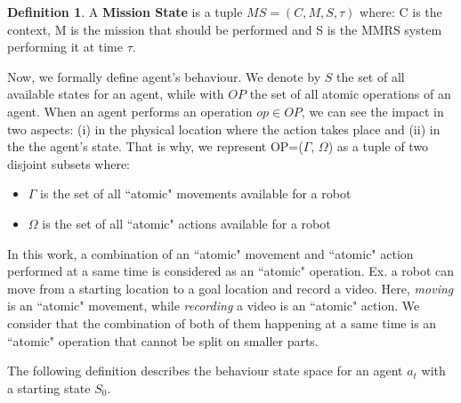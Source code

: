 \documentclass[journal]{IEEEtran}
\theoremstyle{definition}
\newtheorem{definition}{Definition}
\newcommand\patrizio[1]{\nb{Patrizio}{#1}}
\begin{document}
\begin{definition}
A \textbf{Mission State} is a tuple $MS = ( C, M, S, \tau  )$ where: C is the context, M is the mission that should be performed and S is the MMRS system performing it at time $\tau$.
\end{definition}









Now, we formally define agent's behaviour. We denote by  $S$ the set of all available states for an agent, while with $OP$ the set of all atomic operations of an agent. When an agent performs an operation $op \in OP$, we can see the  impact in two aspects: (i) in the physical location where the action takes place and (ii) in the the agent's state.
That is why, we represent  OP=($\Gamma$, $\Omega$) as a tuple of two disjoint subsets where:
\begin{itemize}
    \item $\Gamma$ is the set of all ``atomic" movements available for a robot
    \item $\Omega$ is the set of all ``atomic" actions available for a robot
\end{itemize}

In this work, a combination of an ``atomic" movement and ``atomic" action  performed at a same time is considered as an ``atomic" operation. Ex. a robot can move from a starting location to a goal location and record a video. Here, \textit{moving} is an ``atomic" movement, while \textit{recording} a video is an ``atomic" action. We consider that the combination of both of them happening at a same time is an ``atomic" operation that cannot be split on smaller parts. 



The following definition describes the behaviour state space for an agent $a_t$ with a starting state $S_{0}$.
\end{document}
